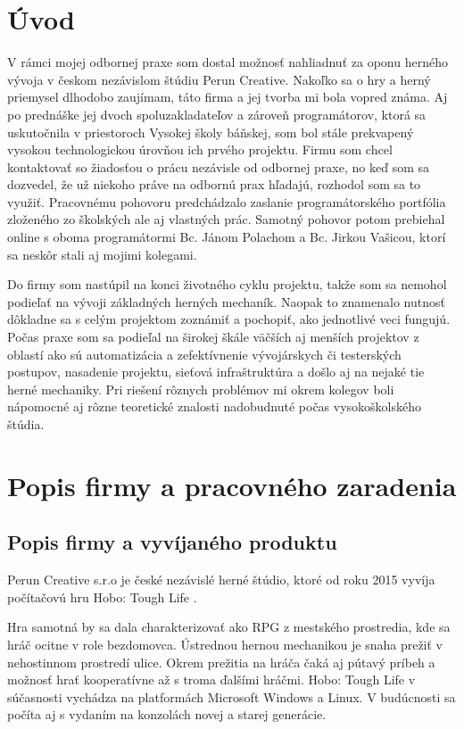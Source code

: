 \documentclass[slovak, bachelorpractice]{diploma}
\begin{document}
\MakeTitlePages

\chapter{Úvod}
\label{sec:Introduction}
V rámci mojej odbornej praxe som dostal možnosť nahliadnuť za oponu herného vývoja v českom nezávislom štúdiu Perun Creative. Nakoľko sa o hry a herný priemysel dlhodobo zaujímam, táto firma a jej tvorba mi bola vopred známa. Aj po prednáške jej dvoch spoluzakladateľov a zároveň programátorov, ktorá sa uskutočnila v priestoroch Vysokej školy báňskej, som bol stále prekvapený vysokou technologickou úrovňou ich prvého projektu. Firmu som chcel kontaktovať so žiadosťou o prácu nezávisle od odbornej praxe, no keď som sa dozvedel, že už niekoho práve na odbornú prax hľadajú, rozhodol som sa to využiť. Pracovnému pohovoru predchádzalo zaslanie programátorského portfólia zloženého zo školských ale aj vlastných prác. Samotný pohovor potom prebiehal online s oboma programátormi Bc. Jánom Polachom a Bc. Jirkou Vašicou, ktorí sa neskôr stali aj mojimi kolegami.

Do firmy som nastúpil na konci životného cyklu projektu, takže som sa nemohol podieľať na vývoji základných herných mechaník. Naopak to znamenalo nutnosť dôkladne sa s celým projektom zoznámiť a pochopiť, ako jednotlivé veci fungujú. Počas praxe som sa podieľal na širokej škále väčších aj menších projektov z oblastí ako sú automatizácia a zefektívnenie vývojárskych či testerských postupov, nasadenie projektu, sieťová infraštruktúra a došlo aj na nejaké tie herné mechaniky. Pri riešení rôznych problémov mi okrem kolegov boli nápomocné aj rôzne teoretické znalosti nadobudnuté počas vysokoškolského štúdia.

\chapter{Popis firmy a pracovného zaradenia}
\label{sec:Firm and me}
\section{Popis firmy a vyvíjaného produktu}
\label{sec:Firm}
Perun Creative s.r.o \cite{Perun} je české nezávislé herné štúdio, ktoré od roku 2015 vyvíja počítačovú hru Hobo: Tough Life \cite{Hobo}.

Hra samotná by sa dala charakterizovať ako RPG z mestského prostredia, kde sa hráč ocitne v role bezdomovca. Ústrednou hernou mechanikou je snaha prežiť v nehostinnom prostredí ulice. Okrem prežitia na hráča čaká aj pútavý príbeh a možnosť hrať kooperatívne až s troma ďalšími hráčmi. Hobo: Tough Life v súčasnosti vychádza na platformách Microsoft Windows a Linux. V budúcnosti sa počíta aj s vydaním na konzolách novej a starej generácie. 
\end{document}
